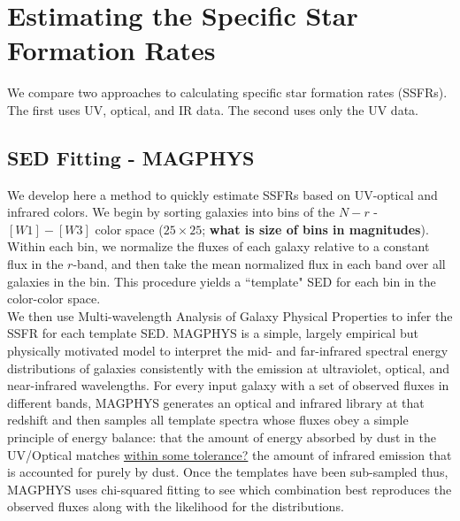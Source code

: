 \documentclass[iop]{emulateapj}
\begin{document}
\section{Estimating the Specific Star Formation Rates}

We compare two approaches to calculating specific star formation rates (SSFRs). 
The first uses UV, optical, and IR data. The second uses only the UV data.

\subsection{SED Fitting - MAGPHYS}

We develop here a method to quickly estimate SSFRs based on UV-optical
and infrared colors. We begin by sorting galaxies into bins of the 
$N-r$ - $[W1]-[W3]$ color space ($25\times25$; \textbf{what is size of
bins in magnitudes}). Within each bin, we normalize the fluxes of 
each galaxy relative to a constant flux in the $r$-band, and then 
take the mean normalized flux in each band over all galaxies in the 
bin. This procedure yields a ``template" SED for each bin in the 
color-color space.\\

We then use Multi-wavelength Analysis of Galaxy Physical Properties 
\cite[MAGPHYS]{daC08} to infer the SSFR for each template SED. MAGPHYS
is a simple, largely empirical but physically motivated model to 
interpret the mid- and far-infrared spectral energy distributions
of galaxies consistently with the emission at ultraviolet, optical,
and near-infrared wavelengths. For every input galaxy with a set 
of observed fluxes in different bands, MAGPHYS generates an 
optical and infrared library at that redshift and then samples 
all template spectra whose fluxes obey a simple principle of 
energy balance: that the amount of energy absorbed by dust 
in the UV/Optical matches \underline{within some tolerance?} 
the amount of infrared emission that is accounted for purely 
by dust. Once the templates have been sub-sampled thus, 
MAGPHYS uses chi-squared fitting to see which combination 
best reproduces the observed fluxes along with the likelihood 
for the distributions.\\
\end{document}
